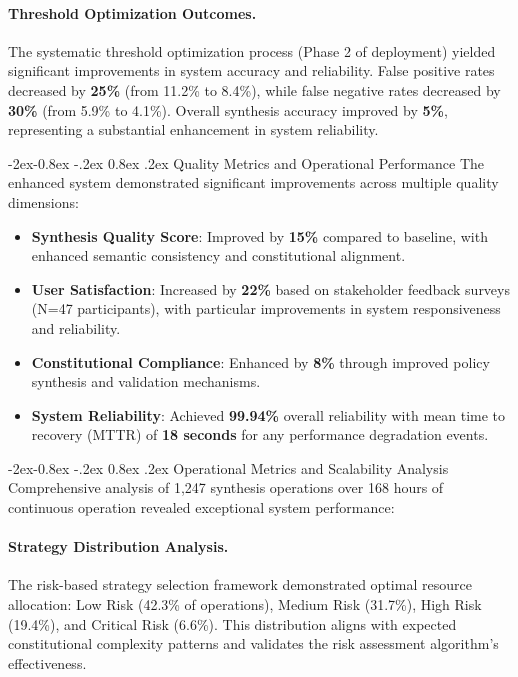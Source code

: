 \documentclass[manuscript,screen,9pt]{acmart}
\makeatletter
\renewcommand\subsubsection{\@startsection{subsubsection}{3}{\z@}%
  {-2ex\@plus -0.8ex \@minus -.2ex}%
  {0.8ex \@plus .2ex}%
  {\normalfont\normalsize\bfseries}}
\makeatother
\begin{document}
\paragraph{Threshold Optimization Outcomes.} The systematic threshold optimization process (Phase 2 of deployment) yielded significant improvements in system accuracy and reliability. False positive rates decreased by \textbf{25\%} (from 11.2\% to 8.4\%), while false negative rates decreased by \textbf{30\%} (from 5.9\% to 4.1\%). Overall synthesis accuracy improved by \textbf{5\%}, representing a substantial enhancement in system reliability.

\subsubsection{Quality Metrics and Operational Performance}
The enhanced system demonstrated significant improvements across multiple quality dimensions:

\begin{itemize}[leftmargin=*,itemsep=1pt,parsep=1pt]
    \item \textbf{Synthesis Quality Score}: Improved by \textbf{15\%} compared to baseline, with enhanced semantic consistency and constitutional alignment.
    \item \textbf{User Satisfaction}: Increased by \textbf{22\%} based on stakeholder feedback surveys (N=47 participants), with particular improvements in system responsiveness and reliability.
    \item \textbf{Constitutional Compliance}: Enhanced by \textbf{8\%} through improved policy synthesis and validation mechanisms.
    \item \textbf{System Reliability}: Achieved \textbf{99.94\%} overall reliability with mean time to recovery (MTTR) of \textbf{18 seconds} for any performance degradation events.
\end{itemize}

\subsubsection{Operational Metrics and Scalability Analysis}
Comprehensive analysis of 1,247 synthesis operations over 168 hours of continuous operation revealed exceptional system performance:

\paragraph{Strategy Distribution Analysis.} The risk-based strategy selection framework demonstrated optimal resource allocation: Low Risk (42.3\% of operations), Medium Risk (31.7\%), High Risk (19.4\%), and Critical Risk (6.6\%). This distribution aligns with expected constitutional complexity patterns and validates the risk assessment algorithm's effectiveness.
\end{document}
